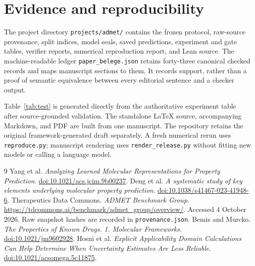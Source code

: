 \documentclass[10pt,twocolumn,a4paper]{article}
\theoremstyle{definition}\newtheorem{observation}{Numerical observation}
\theoremstyle{remark}\newtheorem{remark}{Remark}
\newcommand{\code}[1]{\texttt{\small #1}}
\begin{document}
\section{Evidence and reproducibility}\label{app:evidence}
The project directory \code{projects/admet/} contains the frozen protocol, raw-source provenance, split indices, model seals, saved predictions, experiment and gate tables, verifier reports, numerical reproduction report, and Lean source. The machine-readable ledger \code{paper\_belege.json} retains forty-three canonical checked records and maps manuscript sections to them. It records support, rather than a proof of semantic equivalence between every editorial sentence and a checker output.

Table~\ref{tab:test} is generated directly from the authoritative experiment table after source-grounded validation. The standalone LaTeX source, accompanying Markdown, and PDF are built from one manuscript. The repository retains the original framework-generated draft separately. A fresh numerical rerun uses \code{reproduce.py}; manuscript rendering uses \code{render\_release.py} without fitting new models or calling a language model.

\begin{thebibliography}{9}
 Yang et al. \textit{Analyzing Learned Molecular Representations for Property Prediction}. \href{https://doi.org/10.1021/acs.jcim.9b00237}{doi:10.1021/acs.jcim.9b00237}.
 Deng et al. \textit{A systematic study of key elements underlying molecular property prediction}. \href{https://doi.org/10.1038/s41467-023-41948-6}{doi:10.1038/s41467-023-41948-6}.
 Therapeutics Data Commons. \textit{ADMET Benchmark Group}. \url{https://tdcommons.ai/benchmark/admet_group/overview/}. Accessed 4 October 2026. Raw snapshot hashes are recorded in \code{provenance.json}.
 Bemis and Murcko. \textit{The Properties of Known Drugs. 1. Molecular Frameworks}. \href{https://doi.org/10.1021/jm9602928}{doi:10.1021/jm9602928}.
 Hosni et al. \textit{Explicit Applicability Domain Calculations Can Help Determine When Uncertainty Estimates Are Less Reliable}. \href{https://doi.org/10.1021/acsomega.5c11875}{doi:10.1021/acsomega.5c11875}.
\end{thebibliography}
\end{document}
